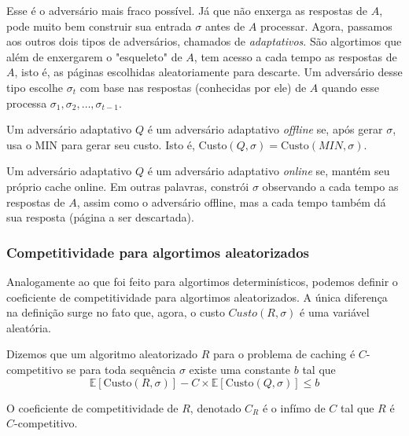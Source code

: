 \documentclass[a4paper,oneside,reqno,12pt]{amsart}
\begin{document}
Esse é o adversário mais fraco possível. Já que não enxerga as respostas de $A$, pode muito bem construir sua entrada $\sigma$ antes de $A$ processar. Agora, passamos aos outros dois tipos de adversários, chamados de \textit{adaptativos}. São algortimos que além de enxergarem o "esqueleto" de $A$, tem acesso a cada tempo as respostas de $A$, isto é, as páginas escolhidas aleatoriamente para descarte. Um adversário desse tipo escolhe $\sigma_t$ com base nas respostas (conhecidas por ele) de $A$ quando esse processa $\sigma_1, \sigma_2, \dots, \sigma_{t-1}$.


\begin{definition}
  Um adversário adaptativo $Q$ é um adversário adaptativo \textit{offline} se, após gerar $\sigma$, usa o MIN para gerar seu custo. Isto é, Custo$(Q, \sigma) = \text{Custo}(MIN, \sigma)$.
\end{definition}

\begin{definition}
  Um adversário adaptativo $Q$ é um adversário adaptativo \textit{online} se, mantém seu próprio cache online. Em outras palavras, constrói $\sigma$ observando a cada tempo as respostas de $A$, assim como o adversário offline, mas a cada tempo também dá sua resposta (página a ser descartada). 
\end{definition}


\subsubsection{Competitividade para algortimos aleatorizados}

Analogamente ao que foi feito para algortimos determinísticos, podemos definir o coeficiente de competitividade para algortimos aleatorizados. A única diferença na definição surge no fato que, agora, o custo $Custo(R, \sigma)$ é uma variável aleatória.

\begin{definition}
  Dizemos que um algoritmo aleatorizado $R$ para o problema de caching é $C$-competitivo se para toda sequência $\sigma$ existe uma constante $b$ tal que
  \begin{equation}
    \mathbb{E}[\text{Custo}(R, \sigma)] - C \times \mathbb{E}[\text{Custo}(Q, \sigma)] \leqslant b
  \end{equation}
  
\end{definition}

O coeficiente de competitividade de $R$, denotado $C_R$ é o infímo de $C$ tal que $R$ é $C$-competitivo.
\end{document}
